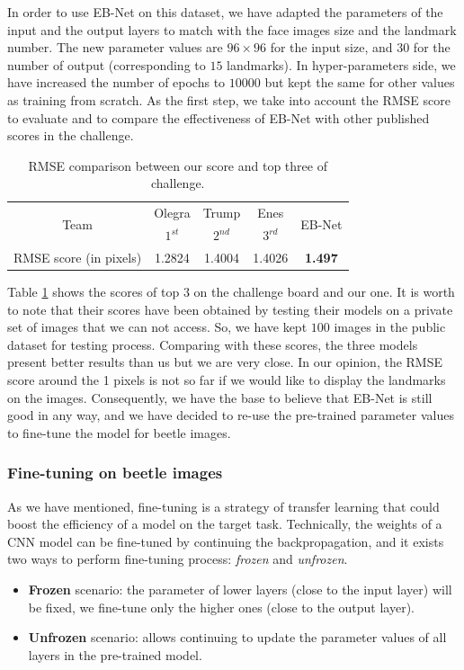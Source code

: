 \documentclass[review]{elsarticle}
\begin{document}
In order to use EB-Net on this dataset, we have adapted the parameters of the input and the output layers to match with the face images size and the landmark number. The new parameter values are $96 \times 96$ for the input size, and $30$ for the number of output (corresponding to $15$ landmarks). In hyper-parameters side, we have increased the number of epochs to $10000$ but kept the same for other values as training from scratch. As the first step, we take into account the RMSE score to evaluate and to compare the effectiveness of EB-Net with other published scores in the challenge.

\begin{table}[h!]
	\centering
	\begin{tabular}{ | c | c | c | c | c |}
	\hline
	\multirow{2}{*}{Team} & Olegra & Trump & Enes & \multirow{2}{*}{EB-Net} \\
	  & $1^{st}$ & $2^{nd}$ & $3^{rd}$ &  \\ \hline
	RMSE score (in pixels) & 1.2824 & 1.4004 & 1.4026 & \textbf{1.497} \\ \hline
\end{tabular}	
	\caption{RMSE comparison between our score and top three of challenge.}
	\label{tblRMSE_challenge}
\end{table}

Table \ref{tblRMSE_challenge} shows the scores of top $3$ on the challenge board and our one. It is worth to note that their scores have been obtained by testing their models on a private set of images that we can not access. So, we have kept $100$ images in the public dataset for testing process. Comparing with these scores, the three models present better results than us but we are very close. In our opinion, the RMSE score around the 1 pixels is not so far if we would like to display the landmarks on the images. Consequently, we have the base to believe that EB-Net is still good in any way, and we have decided to re-use the pre-trained parameter values to fine-tune the model for beetle images. 

\subsubsection{Fine-tuning on beetle images}
As we have mentioned, fine-tuning is a strategy of transfer learning that could boost the efficiency of a model on the target task. Technically, the weights of a CNN model can be fine-tuned by continuing the backpropagation, and it exists two ways to perform fine-tuning process: \textit{frozen} and \textit{unfrozen}.
\begin{itemize}
	\item \textbf{Frozen} scenario: the parameter of lower layers (close to the input layer) will be fixed, we fine-tune only the higher ones (close to the output layer).
	\item \textbf{Unfrozen} scenario: allows continuing to update the parameter values of all layers in the pre-trained model.
\end{itemize}
\end{document}
